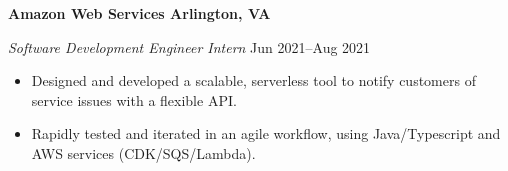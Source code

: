 \textbf{Amazon Web Services \hfill Arlington, VA}\par

\textit{Software Development Engineer Intern} \hfill Jun 2021--Aug 2021
\begin{itemize}
	\item Designed and developed a scalable, serverless tool to notify customers of service issues with a flexible API.
	\item Rapidly tested and iterated in an agile workflow, using Java/Typescript and AWS services (CDK/SQS/Lambda).
\end{itemize}\par